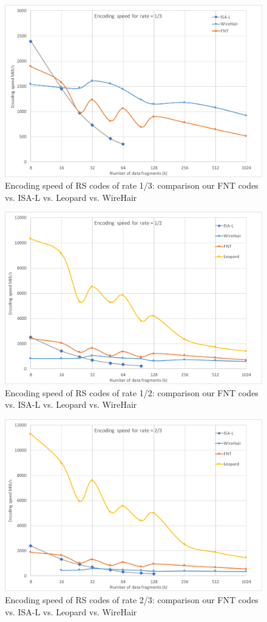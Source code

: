 \documentclass[oneside,9pt]{article}
\begin{document}
\begin{figure}[!ht]
\centering
\includegraphics[width=0.7\columnwidth]{Enc_Rate1-3.pdf}
\caption{Encoding speed of RS codes of rate 1/3: comparison our FNT codes vs. ISA-L vs. Leopard vs. WireHair}
\label{fig:comp_enc_rate_1_3}
\end{figure}

\begin{figure}[!ht]
\centering
\includegraphics[width=0.7\columnwidth]{Enc_Rate1-2.pdf}
\caption{Encoding speed of RS codes of rate 1/2: comparison our FNT codes vs. ISA-L vs. Leopard vs. WireHair}
\label{fig:comp_enc_rate_1_2}
\end{figure}

\begin{figure}[!ht]
\centering
\includegraphics[width=0.7\columnwidth]{Enc_Rate2-3.pdf}
\caption{Encoding speed of RS codes of rate 2/3: comparison our FNT codes vs. ISA-L vs. Leopard vs. WireHair}
\label{fig:comp_enc_rate_2_3}
\end{figure}
\end{document}
